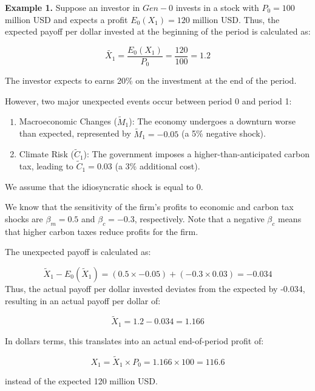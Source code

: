 \begin{example}[]
\textbf{Example 1.} 
Suppose an investor in $Gen-0$ invests in a stock
with $P_0 = 100$ million USD and
expects a profit $E_0(X_1) = 120$ million USD.
Thus, the expected payoff 
per dollar invested at the 
beginning of the period is calculated as:

\begin{equation}
    \tilde{X_1} = \frac{E_0(X_1)}{P_0} = \frac{120}{100} = 1.2
\end{equation}

The investor expects to earns 20\% on the investment
at the end of the period.

However, two major unexpected events occur 
between period 0 and period 1:

\begin{enumerate}
    \item Macroeconomic Changes (\(\tilde{M}_1\)): The economy undergoes a downturn worse than expected, represented by \(\tilde{M}_1 = -0.05\) (a 5\% negative shock).
    \item Climate Risk (\(\tilde{C}_1\)): The government imposes a higher-than-anticipated carbon tax, leading to \(\tilde{C}_1 = 0.03\) (a 3\% additional cost).
\end{enumerate}

We assume that the idiosyncratic shock is equal to 0.

We know that the sensitivity of the firm's 
profits to economic and carbon tax shocks 
are $\beta_m = 0.5$ and $\beta_{c} = - 0.3$, 
respectively. Note that a negative $\beta_{c}$
means that higher carbon taxes reduce profits
for the firm.

The unexpected payoff is calculated as:

\[
\tilde{X}_1 - E_0(\tilde{X}_1) = (0.5 \times -0.05) + (- 0.3 \times 0.03) = -0.034
\]
Thus, the actual payoff per dollar 
invested deviates from the expected 
by -0.034, resulting 
in an actual payoff per dollar of:

\begin{equation}
    \tilde{X}_1 = 1.2-0.034 = 1.166
\end{equation}

In dollars terms, this translates 
into an actual end-of-period profit of:

\begin{equation}
    X_1 = \tilde{X}_1 \times P_0 = 1.166 \times 100 = 116.6
\end{equation}

instead of the expected 120 million USD.

\end{example}


